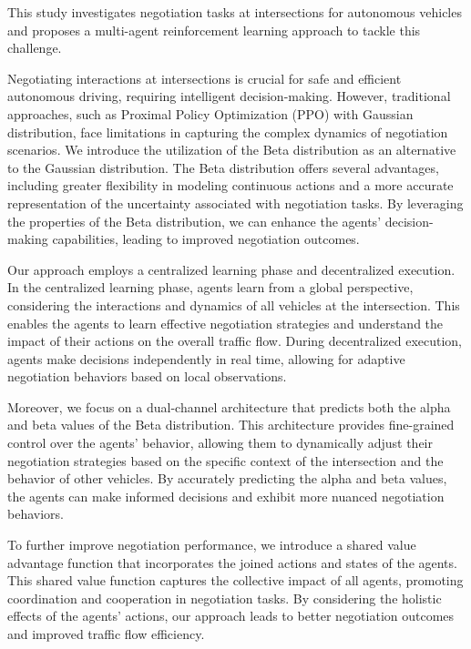 \begin{e-abstract}
This study investigates negotiation tasks at intersections for autonomous vehicles and proposes a multi-agent reinforcement learning approach to tackle this challenge.

Negotiating interactions at intersections is crucial for safe and efficient autonomous driving, requiring intelligent decision-making. However, traditional approaches, such as Proximal Policy Optimization (PPO) with Gaussian distribution, face limitations in capturing the complex dynamics of negotiation scenarios. We introduce the utilization of the Beta distribution as an alternative to the Gaussian distribution. The Beta distribution offers several advantages, including greater flexibility in modeling continuous actions and a more accurate representation of the uncertainty associated with negotiation tasks. By leveraging the properties of the Beta distribution, we can enhance the agents' decision-making capabilities, leading to improved negotiation outcomes.

Our approach employs a centralized learning phase and decentralized execution. In the centralized learning phase, agents learn from a global perspective, considering the interactions and dynamics of all vehicles at the intersection. This enables the agents to learn effective negotiation strategies and understand the impact of their actions on the overall traffic flow. During decentralized execution, agents make decisions independently in real time, allowing for adaptive negotiation behaviors based on local observations.

Moreover, we focus on a dual-channel architecture that predicts both the alpha and beta values of the Beta distribution. This architecture provides fine-grained control over the agents' behavior, allowing them to dynamically adjust their negotiation strategies based on the specific context of the intersection and the behavior of other vehicles. By accurately predicting the alpha and beta values, the agents can make informed decisions and exhibit more nuanced negotiation behaviors.

To further improve negotiation performance, we introduce a shared value advantage function that incorporates the joined actions and states of the agents. This shared value function captures the collective impact of all agents, promoting coordination and cooperation in negotiation tasks. By considering the holistic effects of the agents' actions, our approach leads to better negotiation outcomes and improved traffic flow efficiency.


\end{e-abstract}
